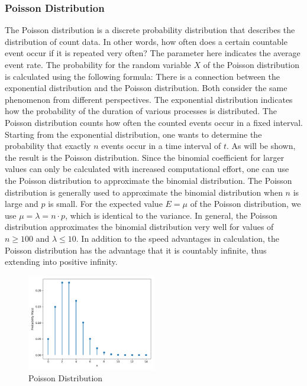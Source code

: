 \subsubsection{Poisson Distribution}\label{Poisson Distribution}
The Poisson distribution is a discrete probability distribution that describes the distribution of count data. In other words, how often does a certain countable event occur if it is repeated very often? The parameter here indicates the average event rate. The probability for the random variable $X$ of the Poisson distribution is calculated using the following formula:
There is a connection between the exponential distribution and the Poisson distribution. Both consider the same phenomenon from different perspectives. The exponential distribution indicates how the probability of the duration of various processes is distributed. The Poisson distribution counts how often the counted events occur in a fixed interval. Starting from the exponential distribution, one wants to determine the probability that exactly $n$ events occur in a time interval of $t$. As will be shown, the result is the Poisson distribution. Since the binomial coefficient for larger values can only be calculated with increased computational effort, one can use the Poisson distribution to approximate the binomial distribution. The Poisson distribution is generally used to approximate the binomial distribution when $n$ is large and $p$ is small. For the expected value $E=\mu$ of the Poisson distribution, we use $\mu=\lambda=n \cdot p$, which is identical to the variance. In general, the Poisson distribution approximates the binomial distribution very well for values of $n \geq 100$ and $\lambda \leq 10$. In addition to the speed advantages in calculation, the Poisson distribution has the advantage that it is countably infinite, thus extending into positive infinity.

\begin{figure}[h]
    \centering
    \includegraphics[width=0.5\textwidth]{../images/plot_poisson_distribution.png}
    \caption{Poisson Distribution}
    \label{fig:poisson_distribution}
\end{figure}

